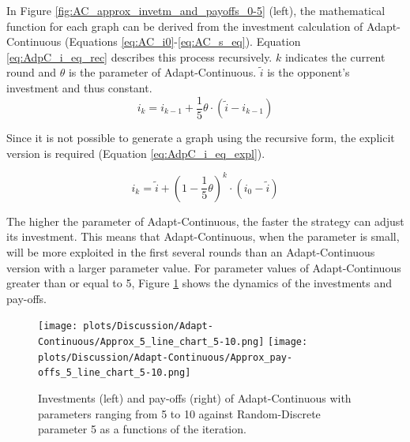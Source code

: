 \documentclass[11pt]{article}
\begin{document}
	\noindent
	In Figure \ref{fig:AC_approx_invetm_and_payoffs_0-5} (left), the mathematical function for each graph can be derived from the investment calculation of Adapt-Continuous (Equations \ref{eq:AC_i0}-\ref{eq:AC_s_eq}).
	Equation \ref{eq:AdpC_i_eq_rec} describes this process recursively.
	$k$ indicates the current round and $\theta$ is the parameter of Adapt-Continuous.
	$\tilde{i}$ is the opponent's investment and thus constant.
	\begin{equation}
		i_k = i_{k-1} + \frac{1}{5}\theta \cdot (\tilde{i} - i_{k-1})
		\label{eq:AdpC_i_eq_rec}
	\end{equation}

	\noindent
	Since it is not possible to generate a graph using the recursive form, the explicit version is required (Equation \ref{eq:AdpC_i_eq_expl}).

	\begin{equation}
		i_k = \tilde{i} + (1 - \frac{1}{5}\theta)^k \cdot (i_0 - \tilde{i})
		\label{eq:AdpC_i_eq_expl}
	\end{equation}
	
	\noindent
	The higher the parameter of Adapt-Continuous, the faster the strategy can adjust its investment.
	This means that Adapt-Continuous, when the parameter is small, will be more exploited in the first several rounds than an Adapt-Continuous version with a larger parameter value.
	For parameter values of Adapt-Continuous greater than or equal to 5, Figure \ref{fig:AC_approx_invetm_and_payoffs_5-10} shows the dynamics of the investments and pay-offs.

	\begin{figure}[!h]
		\centering
		\texttt{[image: plots/Discussion/Adapt-Continuous/Approx\_5\_line\_chart\_5-10.png]}
		\texttt{[image: plots/Discussion/Adapt-Continuous/Approx\_pay-offs\_5\_line\_chart\_5-10.png]}
		\caption{Investments (left) and pay-offs (right) of Adapt-Continuous with parameters ranging from 5 to 10 against Random-Discrete parameter 5 as a functions of the iteration.}
		\label{fig:AC_approx_invetm_and_payoffs_5-10}
	\end{figure}
	
\end{document}
